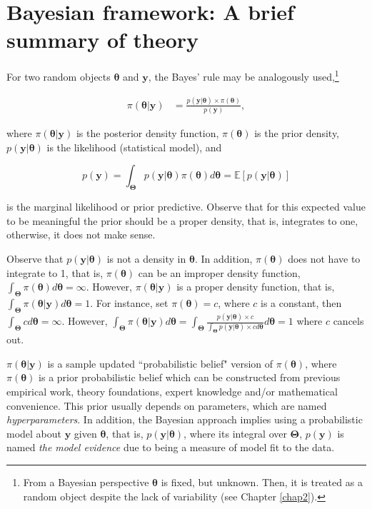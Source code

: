 \section{Bayesian framework: A brief summary of theory}\label{sec12}

For two random objects $\bm{\theta}$ and $\mathbf{y}$, the Bayes' rule may be analogously used,\footnote{From a Bayesian perspective $\mathbf{\theta}$ is fixed, but unknown. Then, it is treated as a random object despite the lack of variability (see Chapter \ref{chap2}).}

\begin{align}
	\pi(\bm{\theta}|\mathbf{y})&=\frac{p(\mathbf{y}|\bm{\theta}) \times \pi(\bm{\theta})}{p(\mathbf{y})},
	\label{eq:121}
\end{align}

where $\pi(\bm{\theta}|\mathbf{y})$ is the posterior density function, $\pi(\bm{\theta})$ is the prior density, $p(\mathbf{y}|\bm{\theta})$ is the likelihood (statistical model), and

\begin{equation}
	p(\mathbf{y})=\int_{\mathbf{\Theta}}p(\mathbf{y}|\bm{\theta})\pi(\bm{\theta})d\bm{\theta}=\mathbb{E}\left[p(\mathbf{y}|\bm{\theta})\right]
	\label{eq:121a}
\end{equation}

is the marginal likelihood or prior predictive. Observe that for this expected value to be meaningful the prior should be a proper density, that is, integrates to one, otherwise, it does not make sense. 

Observe that $p(\mathbf{y}|\bm{\theta})$ is not a density in $\bm{\theta}$. In addition, $\pi(\bm{\theta})$ does not have to integrate to 1, that is, $\pi(\bm{\theta})$ can be an improper density function, $\int_{\mathbf{\Theta}}\pi(\bm{\theta})d\bm{\theta}=\infty$. However, $\pi(\bm{\theta}|\mathbf{y})$ is a proper density function, that is, $\int_{\mathbf{\Theta}}\pi(\bm{\theta}|\mathbf{y})d\bm{\theta}=1$. For instance, set $\pi(\bm{\theta})=c$, where $c$ is a constant, then $\int_{\mathbf{\Theta}}cd\bm{\theta}=\infty$. However, $\int_{\mathbf{\Theta}}\pi(\bm{\theta}|\mathbf{y})d\bm{\theta}=\int_{\mathbf{\Theta}}\frac{p(\mathbf{y}|\bm{\theta})\times c}{\int_{\mathbf{\Theta}} p(\mathbf{y}|\bm{\theta})\times c d\bm{\theta}}d\bm{\theta}=1$ where $c$ cancels out.  

$\pi(\bm{\theta}|\mathbf{y})$ is a sample updated ``probabilistic belief" version of $\pi(\bm{\theta})$, where $\pi(\bm{\theta})$ is a prior probabilistic belief which can be constructed from previous empirical work, theory foundations, expert knowledge and/or mathematical convenience. This prior usually depends on parameters, which are named \textit{hyperparameters}. In addition, the Bayesian approach implies using a probabilistic model about $\mathbf{y}$ given $\bm{\theta}$, that is, $p(\mathbf{y}|\bm{\theta})$, where its integral over $\mathbf{\Theta}$, $p(\mathbf{y})$ is named \textit{the model evidence} due to being a measure of model fit to the data.

